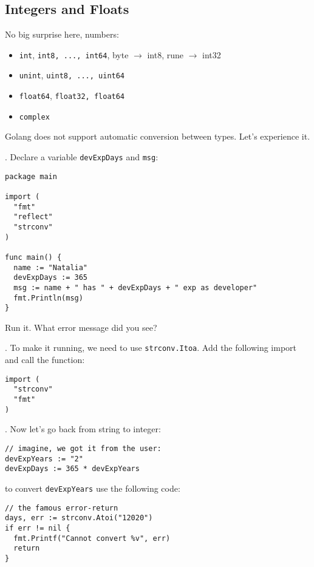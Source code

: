 \documentclass[11pt, letterpaper]{article}
\begin{document}
\subsection{Integers and Floats}

No big surprise here, numbers:

\begin{itemize}
\item \verb|int|, \verb|int8, ..., int64|, byte $\rightarrow$ int8, rune $\rightarrow$ int32
\item \verb|unint|, \verb|uint8, ..., uint64|
\item \verb|float64|, \verb|float32, float64|
\item \verb|complex|
\end{itemize}

Golang does not support automatic conversion between types. Let's experience it.

. Declare a variable \texttt{devExpDays} and \texttt{msg}:

\begin{verbatim}
package main

import (
  "fmt"
  "reflect"
  "strconv"
)

func main() {
  name := "Natalia"
  devExpDays := 365
  msg := name + " has " + devExpDays + " exp as developer"
  fmt.Println(msg)
}
\end{verbatim}

Run it. What error message did you see?

. To make it running, we need to use \texttt{strconv.Itoa}. Add the following import and call the function:

\begin{verbatim}
import (
  "strconv"
  "fmt"
)
\end{verbatim}

. Now let's go back from string to integer:

\begin{verbatim}
// imagine, we got it from the user:
devExpYears := "2"
devExpDays := 365 * devExpYears
\end{verbatim}

to convert \texttt{devExpYears} use the following code:

\begin{verbatim}
// the famous error-return
days, err := strconv.Atoi("12020")
if err != nil {
  fmt.Printf("Cannot convert %v", err)
  return
}
\end{verbatim}
\end{document}
